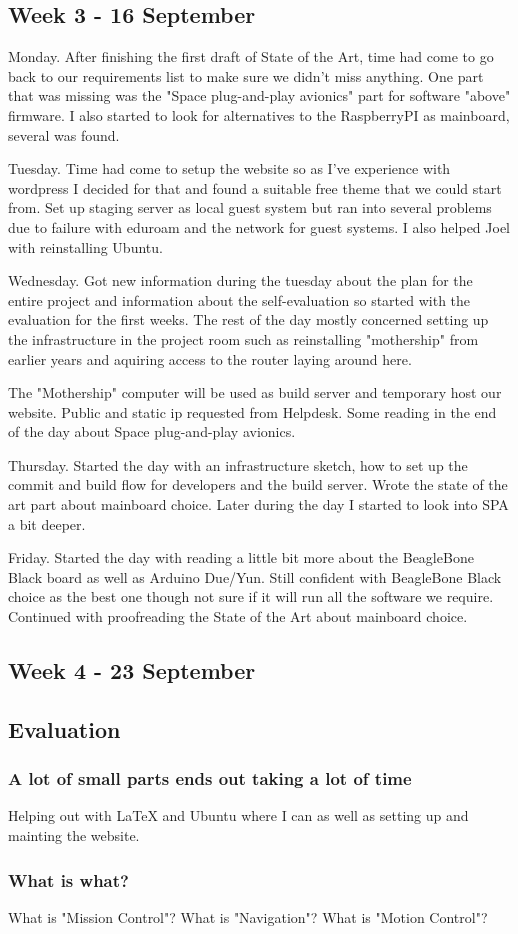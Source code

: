 \subsection{Week 3 - 16 September}\label{week_3}
Monday. After finishing the first draft of State of the Art, time
had come to go back to our requirements list to make sure we didn't miss
anything. One part that was missing was the "Space plug-and-play avionics"
part for software "above" firmware. I also started to look for alternatives
to the RaspberryPI as mainboard, several was found.

Tuesday. Time had come to setup the website so as I've experience with
wordpress I decided for that and found a suitable free theme that we could
start from. Set up staging server as local guest system but ran into several
problems due to failure with eduroam and the network for guest systems. I also
helped Joel with reinstalling Ubuntu.

Wednesday. Got new information during the tuesday about the plan for the entire
project and information about the self-evaluation so started with the
evaluation for the first weeks. The rest of the day mostly concerned setting
up the infrastructure in the project room such as reinstalling "mothership"
from earlier years and aquiring access to the router laying around here.

The "Mothership" computer will be used as build server and temporary host
our website. Public and static ip requested from Helpdesk. Some reading
in the end of the day about Space plug-and-play avionics.

Thursday. Started the day with an infrastructure sketch, how to set up the
commit and build flow for developers and the build server. Wrote the
state of the art part about mainboard choice. Later during the day I started
to look into SPA a bit deeper.

Friday. Started the day with reading a little bit more about the BeagleBone
Black board as well as Arduino Due/Yun. Still confident with BeagleBone Black
choice as the best one though not sure if it will run all the software we
require. Continued with proofreading the State of the Art about mainboard
choice.

\subsection{Week 4 - 23 September}\label{week_4}
\subsection{Evaluation}\label{first_period_evaluation}
\subsubsection{A lot of small parts ends out taking a lot of time}
Helping out with LaTeX and Ubuntu where I can as well as setting up and
mainting the website.

\subsubsection{What is what?}
What is "Mission Control"? What is "Navigation"? What is "Motion Control"?
